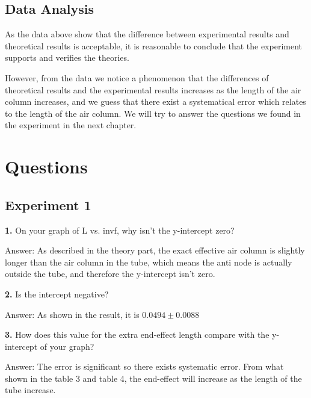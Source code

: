 \documentclass[12pt]{article}
\begin{document}
	\subsection{Data Analysis}
	As the data above show that the difference between experimental results and theoretical results is acceptable, it is reasonable to conclude that the experiment supports and verifies the theories.\par 
	However, from the data we notice a phenomenon that the differences of theoretical results and the experimental results increases as the length of the air column increases, and we guess that there exist a systematical error which relates to the length of the air column. We will try to answer the questions we found in the experiment in the next chapter.
	\section{Questions}
	\subsection{Experiment 1}
	\textbf{1.} On your graph of L vs. invf, why isn't the y-intercept zero? \par 
	Answer: As described in the theory part, the exact effective air column is slightly longer than the air column in the tube, which means the anti node is actually outside the tube, and therefore the y-intercept isn't zero. \par
	\textbf{2.} Is the intercept negative? \par
	Answer: As shown in the result, it is $ 0.0494\pm0.0088 $ \par
	\textbf{3.} How does this value for the extra end-effect length compare with the y-intercept of your graph?\par 
	Answer: The error is significant so there exists systematic error. From what shown in the table 3 and table 4, the end-effect will increase as the length of the tube increase.
\end{document}
